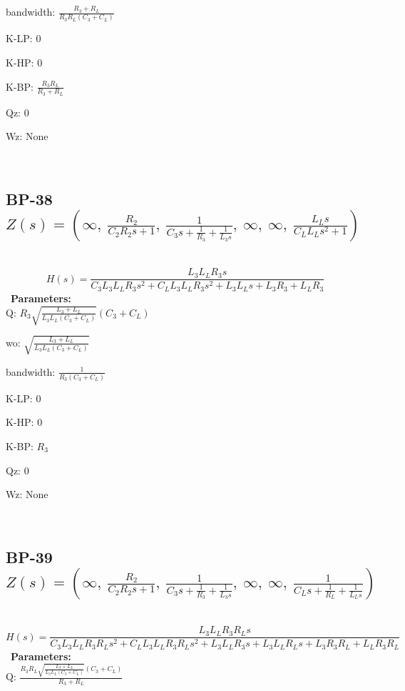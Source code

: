 \documentclass{article}
\begin{document}
bandwidth: $\frac{R_{3} + R_{L}}{R_{3} R_{L} \left(C_{3} + C_{L}\right)}$\ 

K-LP: $0$\ 

K-HP: $0$\ 

K-BP: $\frac{R_{3} R_{L}}{R_{3} + R_{L}}$\ 

Qz: $0$\ 

Wz: $\text{None}$\ 

\ 

\subsection{BP-38 $Z(s) = \left( \infty, \  \frac{R_{2}}{C_{2} R_{2} s + 1}, \  \frac{1}{C_{3} s + \frac{1}{R_{3}} + \frac{1}{L_{3} s}}, \  \infty, \  \infty, \  \frac{L_{L} s}{C_{L} L_{L} s^{2} + 1}\right)$ } \ 
\textbf{\[H(s) = \frac{L_{3} L_{L} R_{3} s}{C_{3} L_{3} L_{L} R_{3} s^{2} + C_{L} L_{3} L_{L} R_{3} s^{2} + L_{3} L_{L} s + L_{3} R_{3} + L_{L} R_{3}}\] } \ 
\textbf{Parameters:}\\ 

Q: $R_{3} \sqrt{\frac{L_{3} + L_{L}}{L_{3} L_{L} \left(C_{3} + C_{L}\right)}} \left(C_{3} + C_{L}\right)$\ 

wo: $\sqrt{\frac{L_{3} + L_{L}}{L_{3} L_{L} \left(C_{3} + C_{L}\right)}}$\ 

bandwidth: $\frac{1}{R_{3} \left(C_{3} + C_{L}\right)}$\ 

K-LP: $0$\ 

K-HP: $0$\ 

K-BP: $R_{3}$\ 

Qz: $0$\ 

Wz: $\text{None}$\ 

\ 

\subsection{BP-39 $Z(s) = \left( \infty, \  \frac{R_{2}}{C_{2} R_{2} s + 1}, \  \frac{1}{C_{3} s + \frac{1}{R_{3}} + \frac{1}{L_{3} s}}, \  \infty, \  \infty, \  \frac{1}{C_{L} s + \frac{1}{R_{L}} + \frac{1}{L_{L} s}}\right)$ } \ 
\textbf{\[H(s) = \frac{L_{3} L_{L} R_{3} R_{L} s}{C_{3} L_{3} L_{L} R_{3} R_{L} s^{2} + C_{L} L_{3} L_{L} R_{3} R_{L} s^{2} + L_{3} L_{L} R_{3} s + L_{3} L_{L} R_{L} s + L_{3} R_{3} R_{L} + L_{L} R_{3} R_{L}}\] } \ 
\textbf{Parameters:}\\ 

Q: $\frac{R_{3} R_{L} \sqrt{\frac{L_{3} + L_{L}}{L_{3} L_{L} \left(C_{3} + C_{L}\right)}} \left(C_{3} + C_{L}\right)}{R_{3} + R_{L}}$\ 
\end{document}

